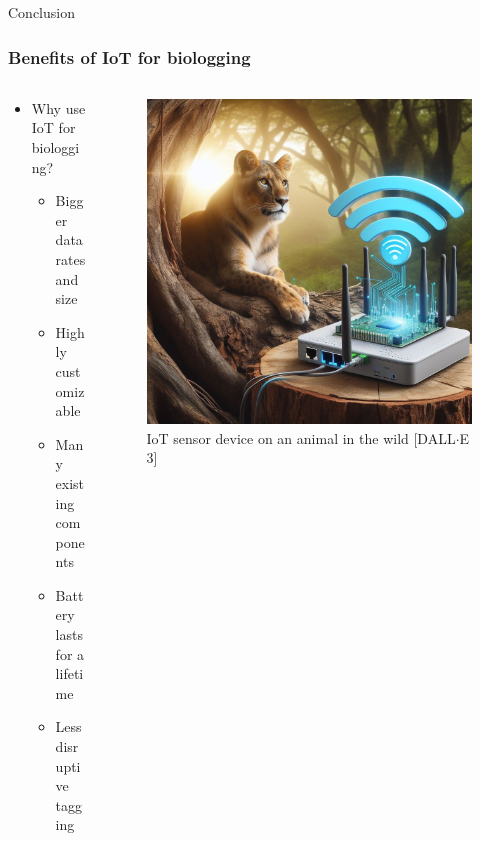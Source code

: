 \documentclass{beamer}
\begin{document}
\begin{frame}{Conclusion}
  \frametitle{Benefits of IoT for biologging}
  \begin{columns}
    \begin{column}{0.5\textwidth}
      \begin{itemize}
        \item Why use IoT for biologging?
        \begin{itemize}
          \item Bigger data rates and size
          \item Highly customizable
          \item Many existing components
          \item Battery lasts for a lifetime
          \item Less disruptive tagging
        \end{itemize}
      \end{itemize}
    \end{column}
    \begin{column}{0.5\textwidth}
      \begin{figure}[htbp]
        \centering
        \includegraphics[width=.9\textwidth]{images/IoT_Lion.jpg}
        \caption{IoT sensor device on an animal in the wild [DALL$\cdot$E 3]}
        \label{fig:IoT_Lion}
      \end{figure}
    \end{column}
  \end{columns}
\end{frame}
\end{document}
